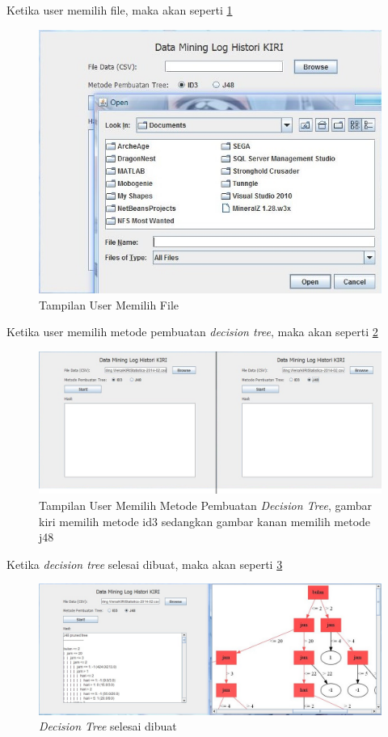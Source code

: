Ketika user memilih file, maka akan seperti \ref{fig:GUI2}
\begin{figure}[H]
\centering
\includegraphics[scale=0.7]{Gambar/GUI2.jpg}
\caption[Tampilan User Memilih File]{Tampilan User Memilih File} 
\label{fig:GUI2}
\end{figure}

\newpage

Ketika user memilih metode pembuatan \textsl{decision tree}, maka akan seperti \ref{fig:GUI3and4}
\begin{figure}[H]
\centering
\includegraphics[scale=0.7]{Gambar/GUI3and4.jpg}
\caption[Tampilan User Memilih Metode Pembuatan \textsl{Decision Tree}]{Tampilan User Memilih Metode Pembuatan \textsl{Decision Tree}, gambar kiri memilih metode id3 sedangkan gambar kanan memilih metode j48} 
\label{fig:GUI3and4}
\end{figure}

Ketika \textsl{decision tree} selesai dibuat, maka akan seperti \ref{fig:GUI5}
\begin{figure}[h]
\centering
\includegraphics[scale=0.5]{Gambar/GUI5.jpg}
\caption[Tampilan \textsl{Decision Tree}Selesai Dibuat]{\textsl{Decision Tree} selesai dibuat} 
\label{fig:GUI5}
\end{figure}